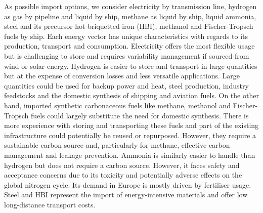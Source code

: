 
As possible import options, we consider electricity by transmission line,
hydrogen as gas by pipeline and liquid by ship, methane as liquid by ship,
liquid ammonia, steel and its precursor hot briquetted iron (HBI), methanol and
Fischer-Tropsch fuels by ship. Each energy vector has unique characteristics
with regards to its production, transport and consumption. Electricity offers
the most flexible usage but is challenging to store and requires variability
management if sourced from wind or solar energy. Hydrogen is easier to store and
transport in large quantities but at the expense of conversion losses and less
versatile applications. Large quantities could be used for backup power and
heat, steel production, industry feedstocks and the domestic synthesis of
shipping and aviation fuels. On the other hand, imported synthetic carbonaceous
fuels like methane, methanol and Fischer-Tropsch fuels could largely substitute
the need for domestic synthesis. There is more experience with storing and
transporting these fuels and part of the existing infrastructure could
potentially be reused or repurposed. However, they require a sustainable carbon
source and, particularly for methane, effective carbon management and leakage
prevention.\cite{shirizadehImpactMethaneLeakage2023} Ammonia is similarly easier
to handle than hydrogen but does not require a carbon source. However, it faces
safety and acceptance concerns due to its toxicity and potentially adverse
effects on the global nitrogen
cycle.\cite{bertagniMinimizingImpactsAmmonia2023,wolframUsingAmmoniaShipping2022}
Its demand in Europe is mostly driven by fertiliser usage. Steel and HBI
represent the import of energy-intensive materials and offer low long-distance
transport costs.


